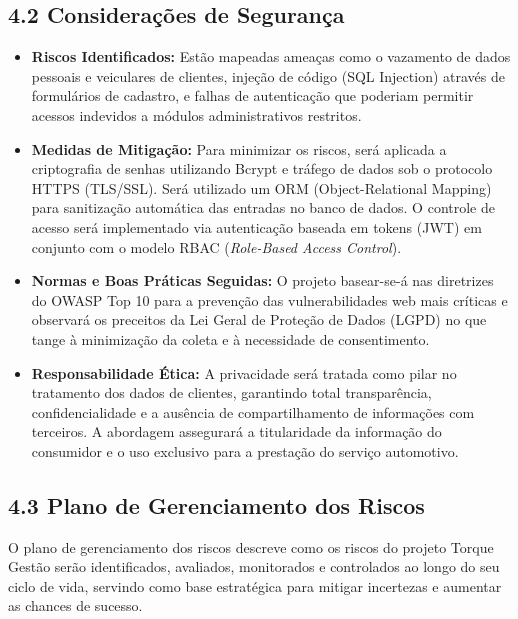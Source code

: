 \documentclass[12pt, a4paper]{article}
\begin{document}
\subsection*{4.2 Considera\c{c}\~oes de Seguran\c{c}a}
 
\begin{itemize}[leftmargin=2cm, itemsep=4pt]
  \item \textbf{Riscos Identificados:} Est\~ao mapeadas amea\c{c}as como o vazamento de dados pessoais e veiculares de clientes, inje\c{c}\~ao de c\'odigo (SQL Injection) atrav\'es de formul\'arios de cadastro, e falhas de autentica\c{c}\~ao que poderiam permitir acessos indevidos a m\'odulos administrativos restritos.
  \item \textbf{Medidas de Mitiga\c{c}\~ao:} Para minimizar os riscos, ser\'a aplicada a criptografia de senhas utilizando Bcrypt e tr\'afego de dados sob o protocolo HTTPS (TLS/SSL). Ser\'a utilizado um ORM (Object-Relational Mapping) para sanitiza\c{c}\~ao autom\'atica das entradas no banco de dados. O controle de acesso ser\'a implementado via autentica\c{c}\~ao baseada em tokens (JWT) em conjunto com o modelo RBAC (\textit{Role-Based Access Control}).
  \item \textbf{Normas e Boas Pr\'aticas Seguidas:} O projeto basear-se-\'a nas diretrizes do OWASP Top 10 para a preven\c{c}\~ao das vulnerabilidades web mais cr\'iticas e observar\'a os preceitos da Lei Geral de Prote\c{c}\~ao de Dados (LGPD) no que tange \`a minimiza\c{c}\~ao da coleta e \`a necessidade de consentimento.
  \item \textbf{Responsabilidade \'Etica:} A privacidade ser\'a tratada como pilar no tratamento dos dados de clientes, garantindo total transpar\^encia, confidencialidade e a aus\^encia de compartilhamento de informa\c{c}\~oes com terceiros. A abordagem assegurar\'a a titularidade da informa\c{c}\~ao do consumidor e o uso exclusivo para a presta\c{c}\~ao do servi\c{c}o automotivo.
\end{itemize}
 
\subsection*{4.3 Plano de Gerenciamento dos Riscos}
 
O plano de gerenciamento dos riscos descreve como os riscos do projeto Torque Gest\~ao ser\~ao
identificados, avaliados, monitorados e controlados ao longo do seu ciclo de vida, servindo
como base estrat\'egica para mitigar incertezas e aumentar as chances de sucesso.
 
\end{document}

